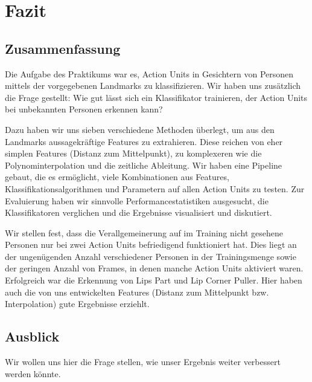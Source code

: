 \chapter{Fazit}\label{ch:fazit}
\section{Zusammenfassung}
Die Aufgabe des Praktikums war es, Action Units in Gesichtern von Personen mittels der vorgegebenen
Landmarks zu klassifizieren.
Wir haben uns zusätzlich die Frage gestellt: Wie gut lässt sich ein Klassifikator
trainieren, der Action Units bei unbekannten Personen erkennen kann?

Dazu haben wir uns sieben verschiedene Methoden überlegt, um aus den Landmarks
aussagekräftige Features zu extrahieren. Diese reichen von eher simplen Features (Distanz
zum Mittelpunkt), zu komplexeren wie die Polynominterpolation und die zeitliche
Ableitung. Wir haben eine Pipeline gebaut, die es ermöglicht, viele
Kombinationen aus Features, Klassifikationsalgorithmen und Parametern auf allen
Action Units zu testen.
Zur Evaluierung haben wir sinnvolle Performancestatistiken ausgesucht, die
Klassifikatoren verglichen und die Ergebnisse visualisiert und diskutiert.

Wir stellen fest, dass die Verallgemeinerung auf im Training nicht gesehene
Personen nur bei zwei Action Units befriedigend funktioniert hat. Dies liegt an
der ungenügenden Anzahl verschiedener Personen in der Trainingsmenge sowie der
geringen Anzahl von Frames, in denen manche Action Units aktiviert waren.
Erfolgreich war die Erkennung von Lips Part und Lip Corner Puller. Hier haben
auch die von uns entwickelten Features (Distanz zum Mittelpunkt bzw.
Interpolation) gute Ergebnisse erziehlt.
\section{Ausblick}
Wir wollen uns hier die Frage stellen, wie unser Ergebnis weiter verbessert werden könnte.

